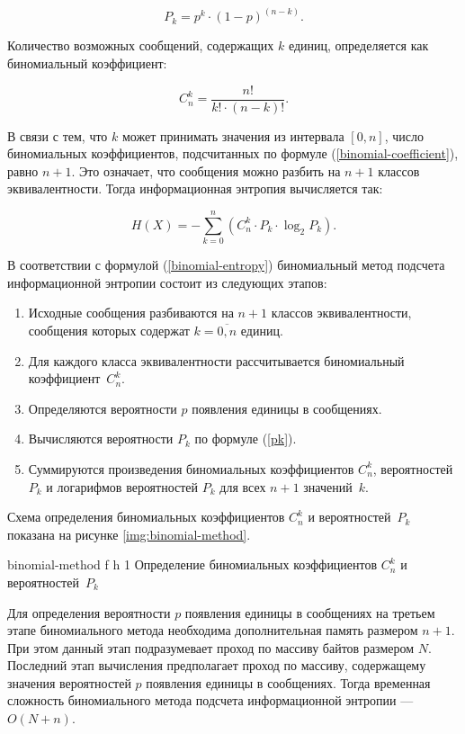 \begin{equation}\label{pk}
	P_{k} = p^k \cdot (1 - p)^{(n - k)}.
\end{equation} 

Количество возможных сообщений, содержащих $k$ единиц, определяется как биномиальный коэффициент:

\begin{equation}\label{binomial-coefficient}
	C_{n}^k = \frac{n!}{k! \cdot (n - k)!}.
\end{equation}

В связи с тем, что $k$ может принимать значения из интервала $[0, n]$, число биномиальных коэффициентов, подсчитанных по формуле (\ref{binomial-coefficient}), равно $n + 1$. Это означает, что сообщения можно разбить на $n + 1$ классов эквивалентности. Тогда информационная энтропия вычисляется так:

\begin{equation}\label{binomial-entropy}
	H(X) = -\sum_{k = 0}^n (C_{n}^k \cdot P_{k} \cdot \log_{2}P_{k}).
\end{equation}

В соответствии с формулой (\ref{binomial-entropy}) биномиальный метод подсчета информационной энтропии состоит из следующих этапов:

\begin{enumerate}
	\item Исходные сообщения разбиваются на $n + 1$ классов эквивалентности, сообщения которых содержат $k = \overline{0, n}$ единиц.
	\item Для каждого класса эквивалентности рассчитывается биномиальный коэффициент~$C_{n}^k$.
	\item Определяются вероятности $p$ появления единицы в сообщениях.
	\item Вычисляются вероятности $P_{k}$ по формуле (\ref{pk}).
	\item Суммируются произведения биномиальных коэффициентов $C_{n}^k$, вероятностей $P_{k}$ и логарифмов вероятностей $P_{k}$ для всех $n + 1$ значений~$k$.
\end{enumerate}

Схема определения биномиальных коэффициентов $C_{n}^k$ и вероятностей~$P_{k}$ показана на рисунке \ref{img:binomial-method}.

    {binomial-method}
    {f}
    {h}
    {1\textwidth}
    {Определение биномиальных коэффициентов $C_{n}^k$ и вероятностей~$P_{k}$}

Для определения вероятности $p$ появления единицы в сообщениях на третьем этапе биномиального метода необходима дополнительная память размером $n + 1$. При этом данный этап подразумевает проход по массиву байтов размером $N$. Последний этап вычисления предполагает проход по массиву, содержащему значения вероятностей $p$ появления единицы в сообщениях. Тогда временная сложность биномиального метода подсчета информационной энтропии --- $O(N + n)$.


